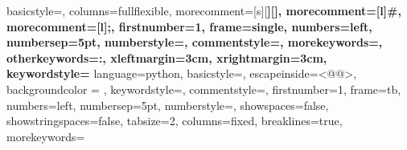 		{
			basicstyle=\ttfamily\small,
			columns=fullflexible,
			morecomment=[s][\color{Orchid}\bfseries]{[}{]},
			morecomment=[l]{\#},
			morecomment=[l]{;},
			firstnumber=1,                	%
			frame=single,	                	%
			numbers=left,                   %
			numbersep=5pt,                  %
			numberstyle=\tiny\color{gray},	%
			commentstyle=\color{gray}\ttfamily,
			morekeywords={},
			otherkeywords={:},
			xleftmargin=3cm,
			xrightmargin=3cm,
			keywordstyle={\color{blue}\bfseries}
		}
	{
		language=python,
		basicstyle=\ttfamily, %
		escapeinside={<@}{@>},
		backgroundcolor = \color{white}, %
		keywordstyle=\color{vbablue},   %
		commentstyle=\color{gray}\ttfamily,  %
		firstnumber=1,                	%
		frame=tb,	                	%
		numbers=left,                   %
		numbersep=5pt,                  %
		numberstyle=\tiny\color{gray},	%
		showspaces=false,               %
		showstringspaces=false,         %
		tabsize=2,		                %
		columns=fixed,					%
		breaklines=true,				%
		morekeywords={}%
	}

